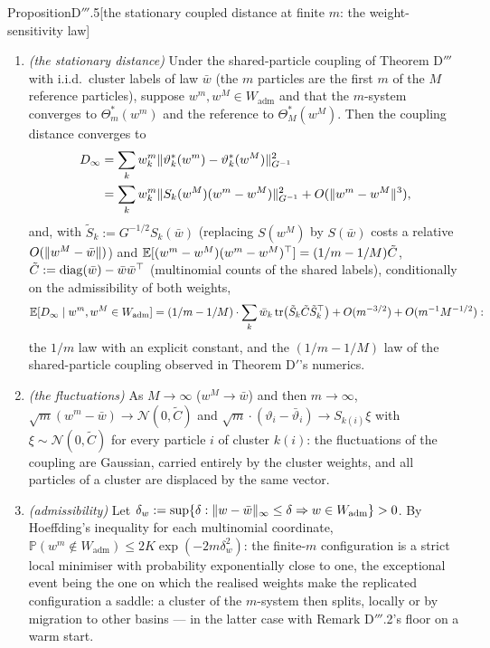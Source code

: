 \begin{thm}{Proposition}{D$'''$.5}[the stationary coupled distance at finite $m$: the weight-sensitivity law]
\begin{enumerate}[label=\textup{(\roman*)}]
    the unstable direction, the cluster weights unchanged) or by particles migrating to other basins; the numerics
    show both (this section, referee rounds 9 and 10).
  \item \emph{(the stationary distance)} Under the shared-particle coupling of Theorem D$'''$ with i.i.d.\ cluster
    labels of law $\bar w$ (the $m$ particles are the first $m$ of the $M$ reference particles), suppose
    $w^m, w^M\in W_{\mathrm{adm}}$ and that the $m$-system converges to $\Theta^*_m(w^m)$ and the reference to
    $\Theta^*_M(w^M)$. Then the coupling distance converges to
    \begin{align*}
      D_\infty &= \sum_kw^m_k\lVert \vartheta^*_k(w^m) - \vartheta^*_k(w^M)\rVert^2_{G^{-1}}\\
      &= \sum_kw^m_k\lVert S_k(w^M)(w^m - w^M)\rVert^2_{G^{-1}} + O(\lVert w^m - w^M\rVert^3),
    \end{align*}
    and, with $\tilde S_k := G^{-1/2}S_k(\bar w)$ (replacing $S(w^M)$ by $S(\bar w)$ costs a relative
    $O(\lVert w^M - \bar w\rVert)$) and $\mathbb{E}[(w^m - w^M)(w^m - w^M)^\top] = (1/m - 1/M)\tilde C$,
    $\tilde C := \operatorname{diag}(\bar w) - \bar w\bar w^\top$ (multinomial counts of the shared labels),
    conditionally on the admissibility of both weights,
    \[
      \mathbb{E}[D_\infty\mid w^m, w^M\in W_{\mathrm{adm}}] = (1/m - 1/M)\cdot\sum_k\bar w_k\operatorname{tr}\bigl(\tilde S_k\tilde C\tilde S_k^\top\bigr)
      + O(m^{-3/2}) + O(m^{-1}M^{-1/2}):
    \]
    the $1/m$ law with an explicit constant, and the $(1/m - 1/M)$ law of the shared-particle coupling observed in
    Theorem D$'$'s numerics.
  \item \emph{(the fluctuations)} As $M\to\infty$ ($w^M\to\bar w$) and then $m\to\infty$,
    $\sqrt m(w^m - \bar w)\to\mathcal{N}(0,\tilde C)$ and $\sqrt m\cdot(\vartheta_i - \bar\vartheta_i)\to S_{k(i)}\xi$
    with $\xi\sim\mathcal{N}(0,\tilde C)$ for every particle $i$ of cluster $k(i)$: the fluctuations of the coupling
    are Gaussian, carried entirely by the cluster weights, and all particles of a cluster are displaced by the same
    vector.
  \item \emph{(admissibility)} Let
    $\delta_w := \sup\{\delta : \lVert w - \bar w\rVert_\infty\le\delta\Rightarrow w\in W_{\mathrm{adm}}\} > 0$. By
    Hoeffding's inequality for each multinomial coordinate,
    $\mathbb{P}(w^m\notin W_{\mathrm{adm}})\le2K\exp(-2m\delta_w^2)$: the finite-$m$ configuration is a strict local
    minimiser with probability exponentially close to one, the exceptional event being the one on which the realised weights make the replicated configuration a saddle: a
    cluster of the $m$-system then splits, locally or by migration to other basins --- in the latter case with
    Remark D$'''$.2's floor on a warm start.
\end{enumerate}
\end{thm}
